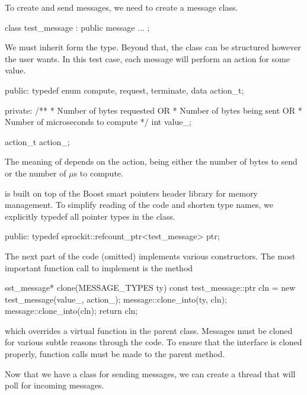 To create and send messages, we need to create a message class.

\begin{CppCode}
class test_message :
    public message
{
...
};
\end{CppCode}
We must inherit form the  type.  
Beyond that, the class can be structured however the user wants.
In this test case, each message will perform an action for some value.

\begin{CppCode}
    public:
        typedef enum { compute, request, terminate, data } action_t;

    private:
        /**
        *    Number of bytes requested OR
        *    Number of bytes being sent OR
        *    Number of microseconds to compute
        */
        int value_;

        action_t action_;
\end{CppCode}
The meaning of  depends on the action, 
being either the number of bytes to send or the number of $\mu$s to compute.

\sstmacro is built on top of the Boost smart pointers header library for memory management. 
To simplify reading of the code and shorten type names, we explicitly typedef all pointer types in the class.

\begin{CppCode}
    public:
        typedef sprockit::refcount_ptr<test_message> ptr;
\end{CppCode}

The next part of the code (omitted) implements various constructors.  
The most important function call to implement is the  method

\begin{CppCode}
        sst_message*
        clone(MESSAGE_TYPES ty) const
        {
            test_message::ptr cln = new test_message(value_, action_);
            message::clone_into(ty, cln);
            message::clone_into(cln);
            return cln;
        }
\end{CppCode}
which overrides a virtual function in the parent class.  
Messages must be cloned for various subtle reasons through the code.
To ensure that the  interface is cloned properly,
function calls must be made to the parent  method.

Now that we have a class for sending messages, we can create a thread that will poll for incoming messages.

